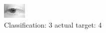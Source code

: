 \begin{figure}[h!]
\begin{center}
\includegraphics[width=0.60\columnwidth]{figures/ID2596_class_3_target_4.png}
\end{center}
\caption{ Classification: 3 actual target: 4}
\label{fig:ID2596_class_3_target_4}
\end{figure}
